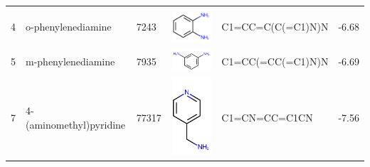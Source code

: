 \documentclass[aps,pre,twocolumn,nofootinbib,superscriptaddress,10pt, final,tightenlines]{revtex4-1}
\begin{document}
\begin{table}
\begin{tabular}{lllp{2cm}>{\ttfamily}lS[table-format=-1.2, table-figures-uncertainty=1]}
4   & o-phenylenediamine       & 7243      & \parbox[c]{1em}{\includegraphics[scale=0.2]{figures/7243.pdf}}  & C1=CC=C(C(=C1)N)N                    & -6.68                                             \\
5   & m-phenylenediamine       & 7935      & \parbox[c]{1em}{\includegraphics[scale=0.2]{figures/7935.pdf}}  & C1=CC(=CC(=C1)N)N                    & -6.69                                             \\
7   & 4-(aminomethyl)pyridine  & 77317     & \parbox[c]{1em}{\includegraphics[scale=0.2]{figures/77317.pdf}} & C1=CN=CC=C1CN                        & -7.56                                             \\

\end{tabular}
\end{table}
\end{document}
